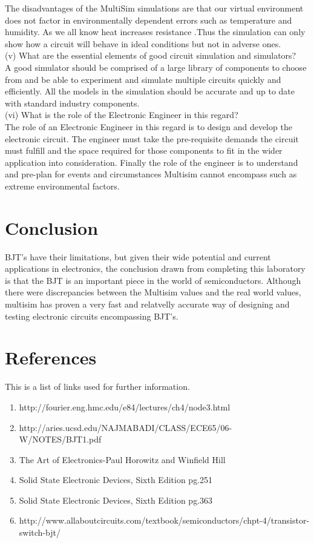 \documentclass{article}
\begin{document}
	The disadvantages of the MultiSim simulations are that our virtual environment does not factor in environmentally dependent errors such as temperature and humidity. As we all know heat increases resistance .Thus the simulation can only show how a circuit will behave in ideal conditions but not in adverse ones.
\\
(v)	What are the essential elements of good circuit simulation and simulators?
\\
A good simulator should be comprised of a large library of components to choose from and be able to experiment and simulate multiple circuits quickly and efficiently. All the models in the simulation should be accurate and up to date with standard industry components. 
\\
(vi) What is the role of the Electronic Engineer in this regard?
\\
	The role of an Electronic Engineer in this regard is to design and develop the electronic circuit. The engineer must take the pre-requisite demands the circuit must fulfill and the space required for those components to fit in the wider application into consideration. Finally the role of the engineer is to understand and pre-plan for events and circumstances Multisim cannot encompass such as extreme environmental factors.


\pagebreak

\section{Conclusion}
BJT's have their limitations, but given their wide potential and current applications in electronics, the conclusion drawn from completing this laboratory is that the BJT is an important piece in the world of semiconductors.	
	Although there were discrepancies between the Multisim values and the real world values, multisim has proven a very fast and relatvelly accurate way of designing and testing electronic circuits encompassing BJT's.\\
	
	



\appendix
\section{References}
This is a list of links used for further information.

	\begin{enumerate}
	
		\item http://fourier.eng.hmc.edu/e84/lectures/ch4/node3.html
		\item http://aries.ucsd.edu/NAJMABADI/CLASS/ECE65/06-W/NOTES/BJT1.pdf
		\item The Art of Electronics-Paul Horowitz and Winfield Hill
		\item Solid State Electronic Devices, Sixth Edition pg.251
		\item Solid State Electronic Devices, Sixth Edition pg.363
		\item http://www.allaboutcircuits.com/textbook/semiconductors/chpt-4/transistor-switch-bjt/
		
		
	\end{enumerate}
\end{document}
